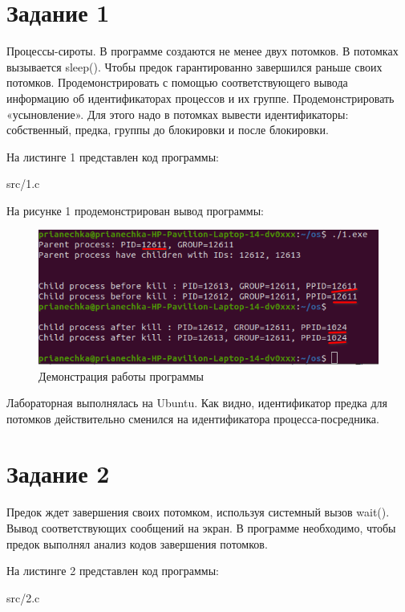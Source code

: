\chapter*{Задание 1}
Процессы-сироты. В программе создаются не менее двух потомков. В потомках вызывается sleep(). 
Чтобы предок гарантированно завершился раньше своих потомков. 
Продемонстрировать с помощью соответствующего вывода информацию об идентификаторах процессов и их группе. 
Продемонстрировать «усыновление». 
Для этого надо в потомках вывести идентификаторы: собственный, предка, группы до блокировки и после блокировки.

На листинге 1 представлен код программы:
\FloatBarrier
\begin{lstinputlisting}[language=C++, caption=Код задания 1, 
	linerange={1-37}, basicstyle=\footnotesize\ttfamily, showstringspaces=false, frame=single,breaklines=true]{src/1.c}
\end{lstinputlisting}
\FloatBarrier

На рисунке 1 продемонстрирован вывод программы:
\FloatBarrier
\begin{figure}[h]
	\begin{center}
		\includegraphics[]{inc/first.png}
	\end{center}
	\caption{Демонстрация работы программы}
\end{figure}
\FloatBarrier

Лабораторная выполнялась на Ubuntu.
Как видно, идентификатор предка для потомков действительно сменился на идентификатора процесса-посредника.

\chapter*{Задание 2}
Предок ждет завершения своих потомком, используя системный вызов wait(). 
Вывод соответствующих сообщений на экран. 
В программе необходимо, чтобы предок выполнял анализ кодов завершения потомков.

На листинге 2 представлен код программы:
\FloatBarrier
\begin{lstinputlisting}[language=C++, caption=Код задания 2, 
	linerange={1-60}, basicstyle=\footnotesize\ttfamily, showstringspaces=false, frame=single,breaklines=true]{src/2.c}
\end{lstinputlisting}
\FloatBarrier


